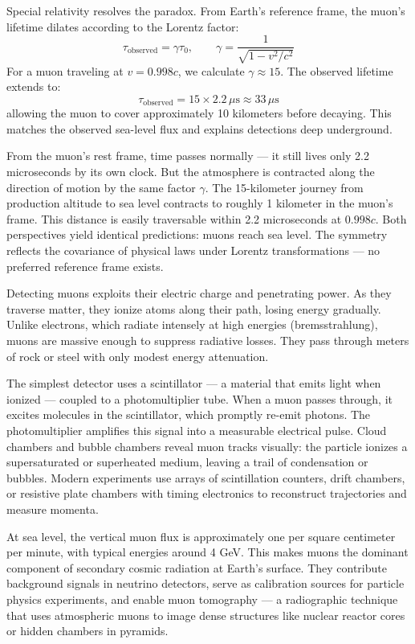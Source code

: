 Special relativity resolves the paradox. From Earth's reference frame, the muon's lifetime dilates according to the Lorentz factor:
\[
\tau_{\text{observed}} = \gamma \tau_0, \qquad \gamma = \frac{1}{\sqrt{1 - v^2/c^2}}
\]
For a muon traveling at $v = 0.998c$, we calculate $\gamma \approx 15$. The observed lifetime extends to:
\[
\tau_{\text{observed}} = 15 \times 2.2\,\mu\text{s} \approx 33\,\mu\text{s}
\]
allowing the muon to cover approximately 10 kilometers before decaying. This matches the observed sea-level flux and explains detections deep underground.

From the muon's rest frame, time passes normally — it still lives only 2.2 microseconds by its own clock. But the atmosphere is contracted along the direction of motion by the same factor $\gamma$. The 15-kilometer journey from production altitude to sea level contracts to roughly 1 kilometer in the muon's frame. This distance is easily traversable within 2.2 microseconds at $0.998c$. Both perspectives yield identical predictions: muons reach sea level. The symmetry reflects the covariance of physical laws under Lorentz transformations — no preferred reference frame exists.

Detecting muons exploits their electric charge and penetrating power. As they traverse matter, they ionize atoms along their path, losing energy gradually. Unlike electrons, which radiate intensely at high energies (bremsstrahlung), muons are massive enough to suppress radiative losses. They pass through meters of rock or steel with only modest energy attenuation.

The simplest detector uses a scintillator — a material that emits light when ionized — coupled to a photomultiplier tube. When a muon passes through, it excites molecules in the scintillator, which promptly re-emit photons. The photomultiplier amplifies this signal into a measurable electrical pulse. Cloud chambers and bubble chambers reveal muon tracks visually: the particle ionizes a supersaturated or superheated medium, leaving a trail of condensation or bubbles. Modern experiments use arrays of scintillation counters, drift chambers, or resistive plate chambers with timing electronics to reconstruct trajectories and measure momenta.

At sea level, the vertical muon flux is approximately one per square centimeter per minute, with typical energies around 4 GeV. This makes muons the dominant component of secondary cosmic radiation at Earth's surface. They contribute background signals in neutrino detectors, serve as calibration sources for particle physics experiments, and enable muon tomography — a radiographic technique that uses atmospheric muons to image dense structures like nuclear reactor cores or hidden chambers in pyramids.

